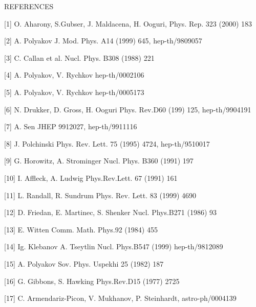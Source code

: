 \documentclass[a4paper,12pt]{article}
\begin{document}
REFERENCES

[1] O. Aharony, S.Gubser, J. Maldacena, H. Ooguri, Phys. Rep. 323
(2000) 183

[2]  A. Polyakov J. Mod. Phys. A14 (1999) 645, hep-th/9809057

[3]  C. Callan et al. Nucl. Phys. B308 (1988) 221

[4]  A. Polyakov, V. Rychkov hep-th/0002106

[5] A. Polyakov, V. Rychkov hep-th/0005173

[6] N. Drukker, D. Gross, H. Ooguri Phys. Rev.D60 (199) 125, hep-th/9904191

[7] A. Sen JHEP 9912027, hep-th/9911116

[8] J. Polchinski Phys. Rev. Lett. 75 (1995) 4724, hep-th/9510017

[9] G. Horowitz, A. Strominger Nucl. Phys. B360 (1991) 197

[10] I. Affleck, A. Ludwig Phys.Rev.Lett. 67 (1991) 161

[11] L. Randall, R. Sundrum Phys. Rev. Lett. 83 (1999) 4690

[12] D. Friedan, E. Martinec, S. Shenker Nucl. Phys.B271 (1986) 93

[13] E. Witten Comm. Math. Phys.92 (1984) 455

[14] Ig. Klebanov A. Tseytlin Nucl. Phys.B547 (1999) hep-th/9812089

[15] A. Polyakov Sov. Phys. Uspekhi 25 (1982) 187

[16] G. Gibbons, S. Hawking Phys.Rev.D15 (1977) 2725

[17] C. Armendariz-Picon, V. Mukhanov, P. Steinhardt, astro-ph/0004139
\end{document}
